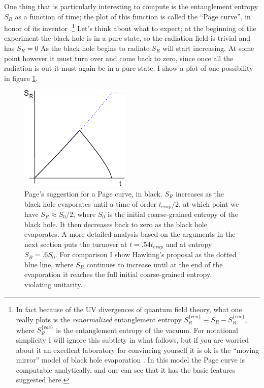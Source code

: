 \documentclass[12pt]{article}
\begin{document}
One thing that is particularly interesting to compute is the entanglement entropy $S_R$ as a function of time; the plot of this function is called the ``Page curve'', in honor of its inventor \cite{Page:1993wv,Page:2013dx}.\footnote{In fact because of the UV divergences of quantum field theory, what one really plots is the \textit{renormalized} entanglement entropy $S_{R}^{\{ren\}}\equiv S_R-S_R^{\{vac\}}$, where $S_R^{\{vac\}}$ is the entanglement entropy of the vacuum.  For notational simplicity I will ignore this subtlety in what follows, but if you are worried about it an excellent laboratory for convincing yourself it is ok is the ``moving mirror'' model of black hole evaporation \cite{Holzhey:1994we}.  In this model the Page curve is computable analytically, and one can see that it has the basic features suggested here.}  Let's think about what to expect; at the beginning of the experiment the black hole is in a pure state, so the radiation field is trivial and has $S_R=0$  As the black hole begins to radiate $S_R$ will start increasing. At some point however it must turn over and come back to zero, since once all the radiation is out it must again be in a pure state.  I show a plot of one possibility in figure \ref{pagecurve}.
\begin{figure}
\begin{center}
\includegraphics[height=5cm]{pagecurve.pdf}
\caption{Page's suggestion for a Page curve, in black.  $S_R$ increases as the black hole evaporates until a time of order $t_{evap}/2$, at which point we have $S_R\approx S_0/2$, where $S_0$ is the initial coarse-grained entropy of the black hole.  It then decreases back to zero as the black hole evaporates.  A more detailed analysis \cite{Page:2013dx} based on the arguments  in the next section puts the turnover at $t=.54 t_{evap}$ and at entropy $S_R=.6 S_0$.  For comparison I show Hawking's proposal as the dotted blue line, where $S_R$ continues to increase until at the end of the evaporation it reaches the full initial coarse-grained entropy, violating unitarity.}\label{pagecurve}
\end{center}
\end{figure}
\end{document}
